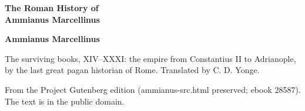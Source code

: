 \documentclass[11pt,letterpaper]{article}
\begin{document}
\color{ink}

\begin{titlepage}
\centering
\vspace*{4em}
{\LARGE\bfseries\color{heading} The Roman History of\\[0.3em]Ammianus Marcellinus\par}
\vspace{2em}
{\Large\bfseries\color{heading} Ammianus Marcellinus\par}
\vspace{2.5em}
{\itshape\color{subhead}\parbox{0.8\linewidth}{\centering The surviving books, XIV--XXXI: the empire from Constantius II to Adrianople, by the last great pagan historian of Rome. Translated by C. D. Yonge.\par}}
\vfill
{\small From the Project Gutenberg edition (ammianus-src.html preserved; ebook 28587). The text is in the public domain.\par}
\vspace{2em}
\end{titlepage}

\tableofcontents


\end{document}
